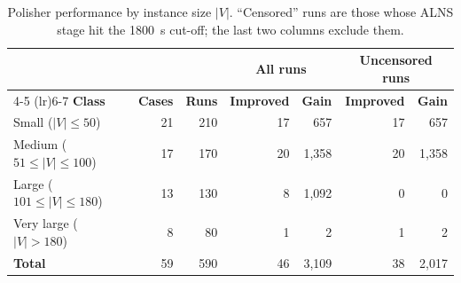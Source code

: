 \begin{table}[t]
\centering
\caption{Polisher performance by instance size $|V|$. ``Censored'' runs are those whose ALNS stage hit the 1800~s cut-off; the last two columns exclude them.}
\label{tab:scale_sensitivity}
\small
\begin{tabular}{l rr rr rr}
\toprule
 & & & \multicolumn{2}{c}{\textbf{All runs}} & \multicolumn{2}{c}{\textbf{Uncensored runs}} \\
\cmidrule(lr){4-5} \cmidrule(lr){6-7}
\textbf{Class} & \textbf{Cases} & \textbf{Runs} & \textbf{Improved} & \textbf{Gain} & \textbf{Improved} & \textbf{Gain} \\
\midrule
Small ($|V| \le 50$) & 21 & 210 & 17 & 657 & 17 & 657 \\
Medium ($51 \le |V| \le 100$) & 17 & 170 & 20 & 1,358 & 20 & 1,358 \\
Large ($101 \le |V| \le 180$) & 13 & 130 & 8 & 1,092 & 0 & 0 \\
Very large ($|V| > 180$) & 8 & 80 & 1 & 2 & 1 & 2 \\
\midrule
\textbf{Total} & 59 & 590 & 46 & 3,109 & 38 & 2,017 \\
\bottomrule
\end{tabular}
\end{table}
